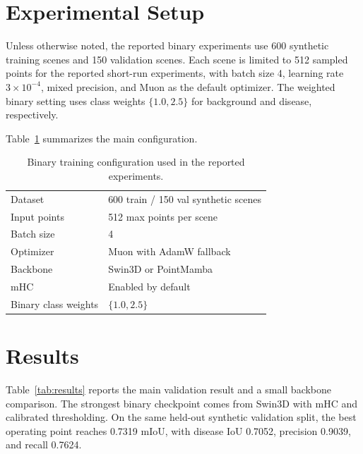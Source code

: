 \documentclass[conference]{IEEEtran}
\begin{document}
\section{Experimental Setup}
Unless otherwise noted, the reported binary experiments use 600 synthetic training scenes and 150 validation scenes. Each scene is limited to 512 sampled points for the reported short-run experiments, with batch size 4, learning rate $3 \times 10^{-4}$, mixed precision, and Muon as the default optimizer. The weighted binary setting uses class weights $\{1.0, 2.5\}$ for background and disease, respectively.

Table~\ref{tab:setup} summarizes the main configuration.

\begin{table}[t]
\centering
\caption{Binary training configuration used in the reported experiments.}
\label{tab:setup}
\small
\begin{tabular}{p{}p{}}
\toprule
Dataset & 600 train / 150 val synthetic scenes \\
Input points & 512 max points per scene \\
Batch size & 4 \\
Optimizer & Muon with AdamW fallback \\
Backbone & Swin3D or PointMamba \\
mHC & Enabled by default \\
Binary class weights & $\{1.0, 2.5\}$ \\
\bottomrule
\end{tabular}
\end{table}

\section{Results}
Table~\ref{tab:results} reports the main validation result and a small backbone comparison. The strongest binary checkpoint comes from Swin3D with mHC and calibrated thresholding. On the same held-out synthetic validation split, the best operating point reaches 0.7319 mIoU, with disease IoU 0.7052, precision 0.9039, and recall 0.7624.
\end{document}
